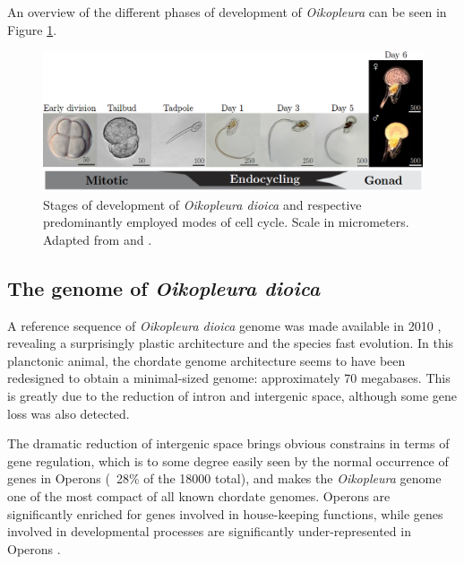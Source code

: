 \documentclass[11pt,twoside,a4paper]{report}
\begin{document}
		An overview of the different phases of development of \textit{Oikopleura} can be seen in 	Figure \ref{fig:LifeCycle}.
		
		\begin{figure}[here]
			\centering
			\includegraphics[width=1\textwidth]{pngs/lifeCycle.png}
			\caption[Development of \textit{Oikopleura} and respective predominantly employed modes of cell cycle]
			{Stages of development of \textit{Oikopleura dioica} and respective predominantly employed modes of cell cycle.
				{\footnotesize
					Scale in micrometers. Adapted from \cite{Fujii2008} and \cite{Bouquet2009}.
				}
			}
			\label{fig:LifeCycle}
		\end{figure}
		

		\subsection{The genome of \textit{Oikopleura dioica}}
		A reference sequence of \textit{Oikopleura dioica} genome was made available in 2010 \cite{Denoeud2010a}, revealing a surprisingly plastic architecture and the species fast evolution. In this planctonic animal, the chordate genome architecture seems to have been redesigned to obtain a minimal-sized genome: approximately 70 megabases. This is greatly due to the reduction of intron and intergenic space, although some gene loss was also detected.
		
		The dramatic reduction of intergenic space brings obvious constrains in terms of gene regulation, which is to some degree easily seen by the normal occurrence of genes in Operons (~28\% of the 18000 total), and makes the \textit{Oikopleura} genome one of the most compact of all known chordate genomes. Operons are significantly enriched for genes involved in house-keeping functions, while genes involved in developmental processes are significantly under-represented in Operons \cite{Denoeud2010a}.
\end{document}
